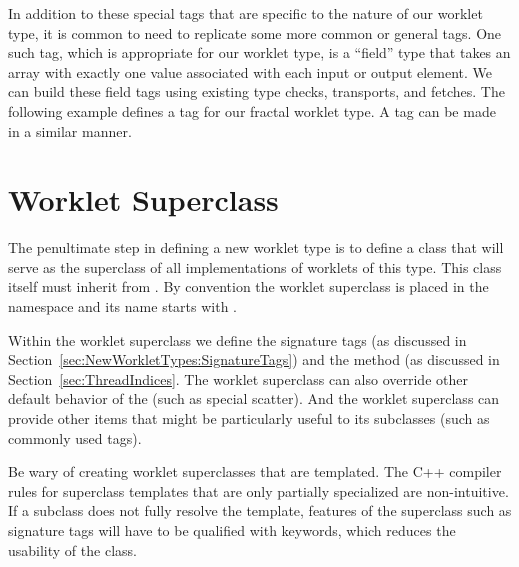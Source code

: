
In addition to these special \controlsignature tags that are specific to the nature of our worklet type, it is common to need to replicate some more common or general \controlsignature tags.
One such tag, which is appropriate for our worklet type, is a ``field'' type that takes an array with exactly one value associated with each input or output element.
We can build these field tags using existing type checks, transports, and fetches.
The following example defines a  tag for our fractal worklet type.
A  tag can be made in a similar manner.



\section{Worklet Superclass}
\label{sec:NewWorkletTypes:WorkletSuperclass}
\label{sec:WorkletSuperclass}

The penultimate step in defining a new worklet type is to define a class that will serve as the superclass of all implementations of worklets of this type.
This class itself must inherit from .
By convention the worklet superclass is placed in the \vtkmworklet{} namespace and its name starts with .

Within the worklet superclass we define the signature tags (as discussed in Section~\ref{sec:NewWorkletTypes:SignatureTags}) and the  method (as discussed in Section~\ref{sec:ThreadIndices}.
The worklet superclass can also override other default behavior of the  (such as special scatter).
And the worklet superclass can provide other items that might be particularly useful to its subclasses (such as commonly used tags).


\begin{commonerrors}
  Be wary of creating worklet superclasses that are templated.
  The C++ compiler rules for superclass templates that are only partially specialized are non-intuitive.
  If a subclass does not fully resolve the template, features of the superclass such as signature tags will have to be qualified with  keywords, which reduces the usability of the class.
\end{commonerrors}

